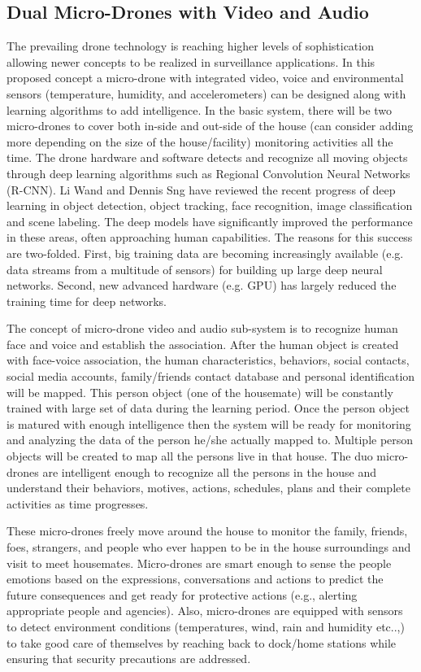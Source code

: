 \documentclass[sigconf]{acmart}
\begin{document}
\subsection{Dual Micro-Drones with Video and Audio}
The prevailing drone technology is reaching higher levels of sophistication allowing newer concepts to be realized in surveillance applications. In this proposed concept a micro-drone with integrated video, voice and environmental sensors (temperature, humidity, and accelerometers) can be designed along with learning algorithms to add intelligence. In the basic system, there will be two micro-drones to cover both in-side and out-side of the house (can consider adding more depending on the size of the house/facility) monitoring activities all the time. The drone hardware and software detects and recognize all moving objects through deep learning algorithms such as Regional Convolution Neural Networks (R-CNN). Li Wand and Dennis Sng\cite{Wang2015} have reviewed the recent progress of deep learning in object detection, object tracking, face recognition, image classification and scene labeling. The deep models have significantly improved the performance in these areas, often approaching human capabilities. The reasons for this success are two-folded. First, big training data are becoming increasingly available (e.g. data streams from a multitude of sensors) for building up large deep neural networks. Second, new advanced hardware (e.g. GPU) has largely reduced the training time for deep networks. 

The concept of micro-drone video and audio sub-system is to recognize human face and voice and establish the association. After the human object is created with face-voice association, the human characteristics, behaviors, social contacts, social media accounts, family/friends contact database and personal identification will be mapped. This person object (one of the housemate) will be constantly trained with large set of data during the learning period. Once the person object is matured with enough intelligence then the system will be ready for monitoring and analyzing the data of the person he/she actually mapped to. Multiple person objects will be created to map all the persons live in that house. The duo micro-drones are intelligent enough to recognize all the persons in the house and understand their behaviors, motives, actions, schedules, plans and their complete activities as time progresses.  

These micro-drones freely move around the house to monitor the family, friends, foes, strangers, and people who ever happen to be in the house surroundings and visit to meet housemates. Micro-drones are smart enough to sense the people emotions based on the expressions, conversations and actions to predict the future consequences and get ready for protective actions (e.g., alerting appropriate people and agencies). Also, micro-drones are equipped with sensors to detect environment conditions (temperatures, wind, rain and humidity etc..,) to take good care of themselves by reaching back to dock/home stations while ensuring that security precautions are addressed. 
\end{document}
